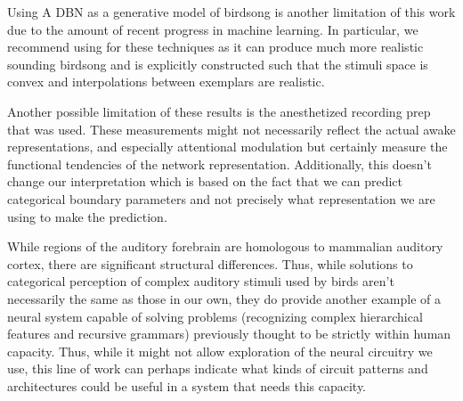 Using A DBN as a generative model of birdsong is another limitation of this work due to the amount of recent progress in machine learning. In particular, we recommend using \cite{GAIA} for these techniques as it can produce much more realistic sounding birdsong and is explicitly constructed such that the stimuli space is convex and interpolations between exemplars are realistic.

Another possible limitation of these results is the anesthetized recording prep that was used. These measurements might not necessarily reflect the actual awake representations, and especially attentional modulation but certainly measure the functional tendencies of the network representation\cite{Emily's attention paper?, Dan's chronic paper?}. Additionally, this doesn't change our interpretation which is based on the fact that we can predict categorical boundary parameters and not precisely what representation we are using to make the prediction.

While regions of the auditory forebrain are homologous to mammalian auditory cortex\cite{wang2010laminar}, there are significant structural differences. Thus, while solutions to categorical perception of complex auditory stimuli used by birds aren't necessarily the same as those in our own, they do provide another example of a neural system capable of solving problems (recognizing complex hierarchical features and recursive grammars) previously thought to be strictly within human capacity. Thus, while it might not allow exploration of the neural circuitry we use, this line of work can perhaps indicate what kinds of circuit patterns and architectures could be useful in a system that needs this capacity.